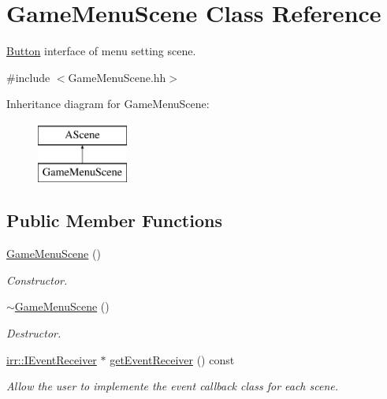 \hypertarget{classGameMenuScene}{}\section{Game\+Menu\+Scene Class Reference}
\label{classGameMenuScene}


\hyperlink{classButton}{Button} interface of menu setting scene.  




{\ttfamily \#include $<$Game\+Menu\+Scene.\+hh$>$}

Inheritance diagram for Game\+Menu\+Scene\+:\begin{figure}[H]
\begin{center}
\leavevmode
\includegraphics[height=2.000000cm]{classGameMenuScene}
\end{center}
\end{figure}
\subsection*{Public Member Functions}
\begin{DoxyCompactItemize}
\item 
\hyperlink{classGameMenuScene_a990633f8037ab2691f0aca251f3d89ee}{Game\+Menu\+Scene} ()
\begin{DoxyCompactList}\small\item\em Constructor. \end{DoxyCompactList}\item 
\hyperlink{classGameMenuScene_afbc6eddfe5f84b6f0b21bc652c9fc435}{$\sim$\+Game\+Menu\+Scene} ()
\begin{DoxyCompactList}\small\item\em Destructor. \end{DoxyCompactList}\item 
\hyperlink{classirr_1_1IEventReceiver}{irr\+::\+I\+Event\+Receiver} $\ast$ \hyperlink{classGameMenuScene_adcb01430b24486c4e5d0157fc32d7611}{get\+Event\+Receiver} () const
\begin{DoxyCompactList}\small\item\em Allow the user to implemente the event callback class for each scene. \end{DoxyCompactList}\end{DoxyCompactItemize}


